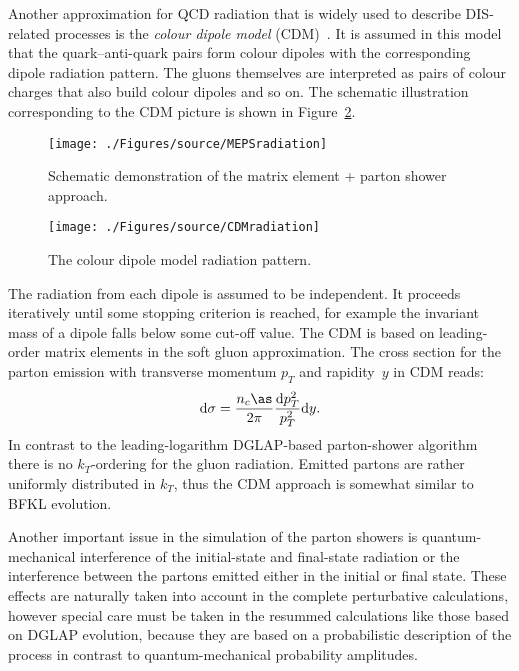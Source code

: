 Another approximation for QCD radiation that is widely used to describe DIS-related processes is the \emph{colour dipole model} (CDM)~\cite{np:b306:746,Andersson:1988ee,Andersson:1990dp,Gustafson:1992uh,Andersson:1988gp,Gustafson:1986db}. It is assumed in this model that the quark--anti-quark pairs form colour dipoles with the corresponding dipole radiation pattern. The gluons themselves are interpreted as pairs of colour charges that also build colour dipoles and so on. The schematic illustration corresponding to the CDM picture is shown in Figure~\ref{fig:cdm}. 
\begin{figure}[t]
	\centering
		\texttt{[image: ./Figures/source/MEPSradiation]}
	\caption{Schematic demonstration of the matrix element + parton shower approach.}
\label{fig:meps}
\end{figure}
\begin{figure}[t]%
\centering
\texttt{[image: ./Figures/source/CDMradiation]}%
\caption{The colour dipole model radiation pattern.}%
\label{fig:cdm}%
\end{figure}
The radiation from each dipole is assumed to be independent. It proceeds iteratively until some stopping criterion is reached, for example the invariant mass of a dipole falls below some cut-off  value. The CDM is based on leading-order matrix elements in the soft gluon approximation. The cross section for the parton emission with transverse momentum $p_T$ and rapidity~$y$ in CDM reads:
\begin{equation}
\mathrm{d}\sigma = \frac{n_c\as}{2\pi}\frac{\mathrm{d}p_T^2}{p_T^2}\mathrm{d}y.
\end{equation}
In contrast to the leading-logarithm DGLAP-based parton-shower algorithm there is no $k_T$-ordering for the gluon radiation. Emitted partons are rather uniformly distributed in $k_T$, thus the CDM approach is somewhat similar to BFKL evolution.

Another important issue in the simulation of the parton showers is quantum-mechanical interference of the initial-state and final-state radiation or the interference between the partons emitted either in the initial or final state. These effects are naturally taken into account in the complete perturbative calculations, however special care must be taken in the resummed calculations like those based on DGLAP evolution, because they are based on a probabilistic description of the process in contrast to quantum-mechanical probability amplitudes.

